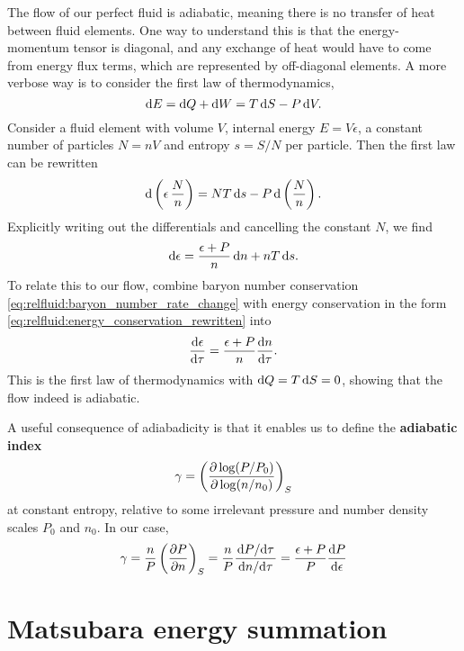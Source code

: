 The flow of our perfect fluid is adiabatic, meaning there is no transfer of heat between fluid elements.
One way to understand this is that the energy-momentum tensor  is diagonal, and any exchange of heat would have to come from energy flux terms, which are represented by off-diagonal elements.
A more verbose way is to consider the first law of thermodynamics,
\begin{equation}
	\mathop{}\!\mathrm{d} E = \mathop{}\!\mathrm{d} Q + \mathop{}\!\mathrm{d} W = T \mathop{}\!\mathrm{d} S - P \mathop{}\!\mathrm{d} V .
\end{equation}
Consider a fluid element with volume $V$, internal energy $E = V \epsilon$, a constant number of particles $N = n V$ and entropy $s = S/N$ per particle.
Then the first law can be rewritten
\begin{equation}
	\mathop{}\!\mathrm{d} \left( \epsilon \, \frac{N}{n} \right) = N T \mathop{}\!\mathrm{d} s - P \mathop{}\!\mathrm{d} \left( \frac{N}{n} \right) .
\end{equation}
Explicitly writing out the differentials and cancelling the constant $N$, we find
\begin{equation}
	\mathop{}\!\mathrm{d} \epsilon = \frac{\epsilon + P}{n} \mathop{}\!\mathrm{d} n + n T \mathop{}\!\mathrm{d} s .
\end{equation}
To relate this to our flow, combine baryon number conservation \eqref{eq:relfluid:baryon_number_rate_change} with energy conservation in the form \eqref{eq:relfluid:energy_conservation_rewritten} into
\begin{equation}
	\odv{\epsilon}{\tau} = \frac{\epsilon + P}{n} \odv{n}{\tau} .
\end{equation}
This is the first law of thermodynamics with $\mathop{}\!\mathrm{d} Q = T \mathop{}\!\mathrm{d} S = 0$, showing that the flow indeed is adiabatic.

A useful consequence of adiabadicity is that it enables us to define the \textbf{adiabatic index}
\begin{equation}
	\gamma = \left( \pdv{\log (P/P_0)}{\log (n/n_0)} \right)_S
\end{equation}
at constant entropy, relative to some irrelevant pressure and number density scales $P_0$ and $n_0$.
In our case,
\begin{equation}
	\gamma = \frac{n}{P} \left( \pdv{P}{n} \right)_S
	       = \frac{n}{P} \frac{\odv{P}/{\tau}}{\odv{n}/{\tau}}
	       = \frac{\epsilon+P}{P} \odv{P}{\epsilon}
\label{eq:relfluid:adiabadicity}
\end{equation}


\chapter{Matsubara energy summation}
\label{chap:matsum}

